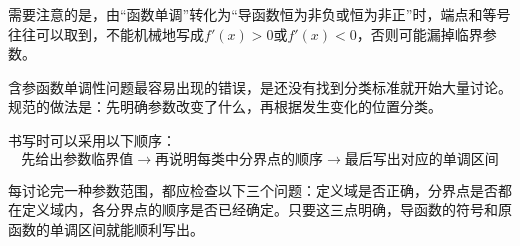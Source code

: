 需要注意的是，由“函数单调”转化为“导函数恒为非负或恒为非正”时，端点和等号往往可以取到，不能机械地写成$f'(x)>0$或$f'(x)<0$，否则可能漏掉临界参数。

\medskip
{}

含参函数单调性问题最容易出现的错误，是还没有找到分类标准就开始大量讨论。规范的做法是：先明确参数改变了什么，再根据发生变化的位置分类。

书写时可以采用以下顺序：
\[
\boxed{
\text{先给出参数临界值}
\longrightarrow
\text{再说明每类中分界点的顺序}
\longrightarrow
\text{最后写出对应的单调区间}
}
\]

每讨论完一种参数范围，都应检查以下三个问题：定义域是否正确，分界点是否都在定义域内，各分界点的顺序是否已经确定。只要这三点明确，导函数的符号和原函数的单调区间就能顺利写出。
